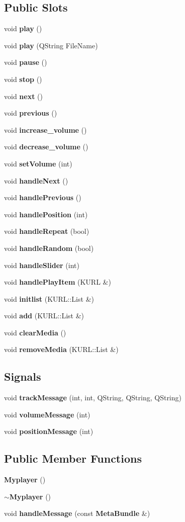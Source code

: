 \subsection*{Public Slots}
\begin{CompactItemize}
\item 
void {\bf play} ()
\item 
void {\bf play} (QString File\-Name)
\item 
void {\bf pause} ()
\item 
void {\bf stop} ()
\item 
void {\bf next} ()
\item 
void {\bf previous} ()
\item 
void {\bf increase\_\-volume} ()
\item 
void {\bf decrease\_\-volume} ()
\item 
void {\bf set\-Volume} (int)
\item 
void {\bf handle\-Next} ()
\item 
void {\bf handle\-Previous} ()
\item 
void {\bf handle\-Position} (int)
\item 
void {\bf handle\-Repeat} (bool)
\item 
void {\bf handle\-Random} (bool)
\item 
void {\bf handle\-Slider} (int)
\item 
void {\bf handle\-Play\-Item} (KURL \&)
\item 
void {\bf initlist} (KURL::List \&)
\item 
void {\bf add} (KURL::List \&)
\item 
void {\bf clear\-Media} ()
\item 
void {\bf remove\-Media} (KURL::List \&)
\end{CompactItemize}
\subsection*{Signals}
\begin{CompactItemize}
\item 
void {\bf track\-Message} (int, int, QString, QString, QString)
\item 
void {\bf volume\-Message} (int)
\item 
void {\bf position\-Message} (int)
\end{CompactItemize}
\subsection*{Public Member Functions}
\begin{CompactItemize}
\item 
{\bf Myplayer} ()
\item 
{\bf $\sim$Myplayer} ()
\item 
void {\bf handle\-Message} (const {\bf Meta\-Bundle} \&)
\end{CompactItemize}
